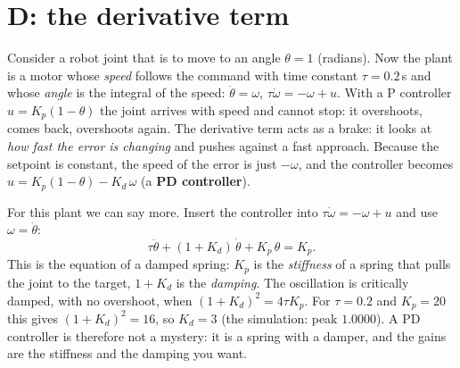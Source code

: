\section*{D: the derivative term}
Consider a robot joint that is to move to an angle $\theta=1$ (radians). Now the plant is a motor whose \emph{speed} follows the command with time constant $\tau=0.2$\,s and whose \emph{angle} is the integral of the speed: $\dot\theta=\omega$, $\tau\dot\omega=-\omega+u$. With a P controller $u=K_p(1-\theta)$ the joint arrives with speed and cannot stop: it overshoots, comes back, overshoots again. The derivative term acts as a brake: it looks at \emph{how fast the error is changing} and pushes against a fast approach. Because the setpoint is constant, the speed of the error is just $-\omega$, and the controller becomes $u=K_p(1-\theta)-K_d\,\omega$ (a \textbf{PD controller}).

\begin{center}
\label{fig:ctl1servo}
\end{center}

For this plant we can say more. Insert the controller into $\tau\dot\omega=-\omega+u$ and use $\omega=\dot\theta$:
\[
\tau\ddot\theta+(1+K_d)\,\dot\theta+K_p\,\theta=K_p .
\]
This is the equation of a damped spring: $K_p$ is the \emph{stiffness} of a spring that pulls the joint to the target, $1+K_d$ is the \emph{damping}. The oscillation is critically damped, with no overshoot, when $(1+K_d)^2=4\tau K_p$. For $\tau=0.2$ and $K_p=20$ this gives $(1+K_d)^2=16$, so $K_d=3$ (the simulation: peak $1.0000$). A PD controller is therefore not a mystery: it is a spring with a damper, and the gains are the stiffness and the damping you want.

